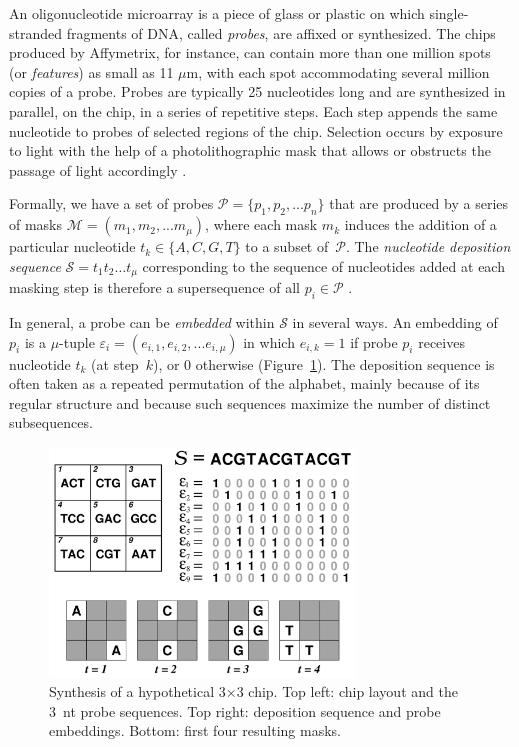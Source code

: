 \documentclass[english]{lni}
\newcommand{\ignore}[1]{}
\begin{document}
An oligonucleotide microarray is a piece of glass or plastic on which
single-stranded fragments of DNA, called \emph{probes}, are affixed or
synthesized. The chips produced by Affymetrix, for instance, can contain more
than one million spots (or \emph{features}) as small as 11 $\mu$m, with each
spot accommodating several million copies of a probe. Probes are typically 25
nucleotides long and are synthesized in parallel, on the chip, in a series of
repetitive steps. Each step appends the same nucleotide to probes of selected
regions of the chip. Selection occurs by exposure to light with the help of a
photolithographic mask that allows or obstructs the passage of light
accordingly \cite{FODOR91}.

Formally, we have a set of probes $\mathcal{P} = \{p_{1}, p_{2}, ... p_{n}\}$
that are produced by a series of masks
$\mathcal{M} = (m_{1}, m_{2}, ... m_{\mu})$, where each mask $m_{k}$ induces the
addition of a particular nucleotide $t_{k} \in \{A, C, G, T\}$ to a subset
of~$\mathcal{P}$. The \emph{nucleotide deposition sequence}
$\mathcal{S} = t_{1} t_{2} \ldots t_{\mu}$ corresponding to the sequence of
nucleotides added at each masking step is therefore a supersequence of all
$p_{i} \in \mathcal{P}$ \cite{RAHMANN03}.

In general, a probe can be \emph{embedded} within $\mathcal{S}$ in several ways.
An embedding of $p_{i}$ is a $\mu$-tuple
$\varepsilon_{i} = (e_{i,1}, e_{i,2}, ... e_{i,\mu})$ in which $e_{i,k} = 1$ if
probe $p_{i}$ receives nucleotide $t_{k}$ (at step~$k$), or 0 otherwise
(Figure~\ref{fig:masking_process}).
The deposition sequence is often taken as a repeated permutation of the
alphabet, mainly because of its regular structure and because such sequences
maximize the number of distinct subsequences. \ignore{ \cite{CHASE76}.}

\begin{figure}
\centerline{\includegraphics[width=230pt]{chip}}
\caption{Synthesis of a hypothetical 3$\times$3 chip. Top left: chip
layout and the 3~nt probe sequences. Top right: deposition
sequence and probe embeddings. Bottom: first four resulting masks.}
\label{fig:masking_process}
\end{figure}
\end{document}
